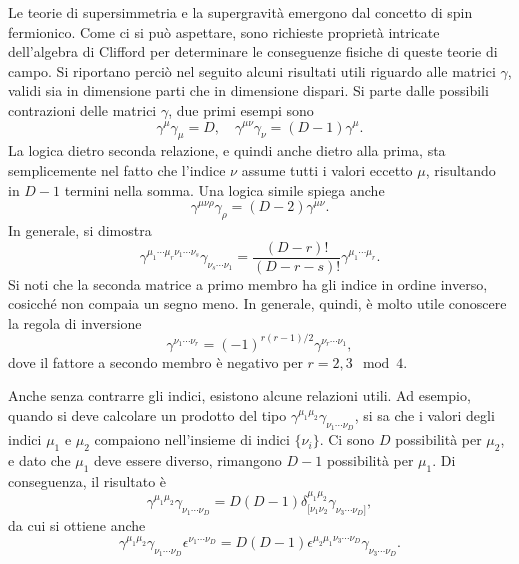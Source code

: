 Le teorie di supersimmetria e la supergravità emergono dal concetto di spin fermionico. Come ci si può aspettare, sono richieste proprietà intricate dell'algebra di Clifford per determinare le conseguenze fisiche di queste teorie di campo. Si riportano perciò nel seguito alcuni risultati utili riguardo alle matrici $\gamma$, validi sia in dimensione parti che in dimensione dispari. Si parte dalle possibili contrazioni delle matrici $\gamma$, due primi esempi sono 
\begin{equation}
    \gamma^\mu\gamma_\mu = D,\quad \gamma^{\mu\nu}\gamma_\nu = (D - 1)\gamma^\mu.
\end{equation}
La logica dietro seconda relazione, e quindi anche dietro alla prima, sta semplicemente nel fatto che l'indice $\nu$ assume tutti i valori eccetto $\mu$, risultando in $D - 1$ termini nella somma. Una logica simile spiega anche 
\begin{equation}
    \gamma^{\mu\nu\rho}\gamma_\rho = (D - 2)\gamma^{\mu\nu}.
\end{equation}
In generale, si dimostra 
\begin{equation}
\label{eq: contrazione generale matrici di Dirac}
    \gamma^{\mu_1\cdots\mu_r\nu_1\cdots\nu_s}\gamma_{\nu_s\cdots \nu_1} = \frac{(D - r)!}{(D - r - s)!}\gamma^{\mu_1\cdots\mu_r}.
\end{equation}
Si noti che la seconda matrice a primo membro ha gli indice in ordine inverso, cosicché non compaia un segno meno. In generale, quindi, è molto utile conoscere la regola di inversione
\begin{equation}
\label{eq: regola inversione indici matrici di Dirac}
    \gamma^{\nu_1\cdots\nu_r} = (-1)^{r(r - 1)/2}\gamma^{\nu_r\cdots\nu_1},
\end{equation}
dove il fattore a secondo membro è negativo per $r = 2,3 \mod 4$. 

Anche senza contrarre gli indici, esistono alcune relazioni utili. Ad esempio, quando si deve calcolare un prodotto del tipo $\gamma^{\mu_1\mu_2}\gamma_{\nu_1\cdots\nu_D}$, si sa che i valori degli indici $\mu_1$ e $\mu_2$ compaiono nell'insieme di indici $\{\nu_i\}$. Ci sono $D$ possibilità per $\mu_2$, e dato che $\mu_1$ deve essere diverso, rimangono $D - 1$ possibilità per $\mu_1$. Di conseguenza, il risultato è 
\begin{equation}
    \gamma^{\mu_1\mu_2}\gamma_{\nu_1\cdots\nu_D} = D(D - 1)\delta^{\mu_1\mu_2}_{[\nu_1\nu_2}\gamma_{\nu_3\cdots\nu_D]},
\end{equation}
da cui si ottiene anche 
\begin{equation}
    \gamma^{\mu_1\mu_2}\gamma_{\nu_1\cdots\nu_D}\epsilon^{\nu_1\cdots\nu_D} = D(D - 1)\epsilon^{\mu_2\mu_1\nu_3\cdots\nu_D}\gamma_{\nu_3\cdots\nu_D}.
\end{equation}

